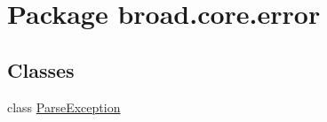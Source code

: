 \hypertarget{namespacebroad_1_1core_1_1error}{\section{Package broad.\+core.\+error}
\label{namespacebroad_1_1core_1_1error}
}
\subsection*{Classes}
\begin{DoxyCompactItemize}
\item 
class \hyperlink{classbroad_1_1core_1_1error_1_1_parse_exception}{Parse\+Exception}
\end{DoxyCompactItemize}

